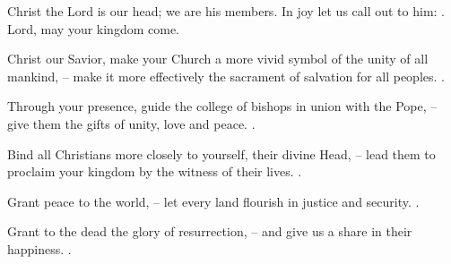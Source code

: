 \lettrine[lines=2]{C}{}hrist the Lord is our head; we are his members. In joy let us call out to him: \Rbar. Lord, may your kingdom come.

Christ our Savior, make your Church a more vivid symbol of the unity of all mankind, – make it more effectively the sacrament of salvation for all peoples. \Rbar.

Through your presence, guide the college of bishops in union with the Pope, – give them the gifts of unity, love and peace. \Rbar.

Bind all Christians more closely to yourself, their divine Head, – lead them to proclaim your kingdom by the witness of their lives. \Rbar.

Grant peace to the world, – let every land flourish in justice and security. \Rbar.

Grant to the dead the glory of resurrection, – and give us a share in their happiness. \Rbar.